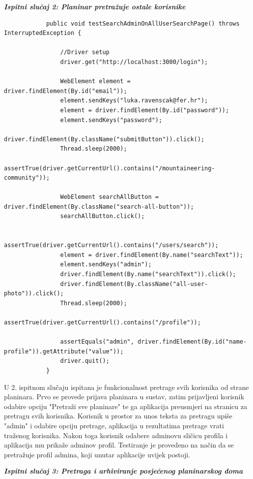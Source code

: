 	 		\textbf{\textit{Ispitni slučaj 2: Planinar pretražuje ostale korisnike}}
	 	
	 	\begin{lstlisting}
	 		public void testSearchAdminOnAllUserSearchPage() throws InterruptedException {
	 			
	 			//Driver setup
	 			driver.get("http://localhost:3000/login");
	 			
	 			WebElement element = driver.findElement(By.id("email"));        
	 			element.sendKeys("luka.ravenscak@fer.hr");
	 			element = driver.findElement(By.id("password"));
	 			element.sendKeys("password");
	 			driver.findElement(By.className("submitButton")).click();
	 			Thread.sleep(2000);
	 			assertTrue(driver.getCurrentUrl().contains("/mountaineering-community"));
	 			
	 			WebElement searchAllButton = driver.findElement(By.className("search-all-button"));
	 			searchAllButton.click(); 
	 			
	 			assertTrue(driver.getCurrentUrl().contains("/users/search"));    
	 			element = driver.findElement(By.name("searchText"));        
	 			element.sendKeys("admin");
	 			driver.findElement(By.name("searchText")).click();
	 			driver.findElement(By.className("all-user-photo")).click();
	 			Thread.sleep(2000);	    
	 			assertTrue(driver.getCurrentUrl().contains("/profile"));
	 			
	 			assertEquals("admin", driver.findElement(By.id("name-profile")).getAttribute("value"));
	 			driver.quit();
	 		}
	 	\end{lstlisting}
 	
	 	U 2. ispitnom slučaju ispitana je funkcionalnost pretrage svih korisnika od strane planinara. Prvo se provede prijava planinara u sustav, zatim prijavljeni korisnik odabire opciju "Pretraži sve planinare" te ga aplikacija preusmjeri na stranicu za pretragu svih korisnika. Korisnik u prostor za unos teksta za pretragu upiše "admin" i odabire opciju pretrage, aplikacija u rezultatima pretrage vrati traženog korisnika. Nakon toga korisnik odabere adminovu sličicu profila i aplikacija mu prikaže adminov profil. Testiranje je provedeno na način da se pretražuje profil admina, koji unutar aplikacije uvijek postoji.\newline
	 	
 		\textbf{\textit{Ispitni slučaj 3: Pretraga i arhiviranje posjećenog planinarskog doma}}
 		
